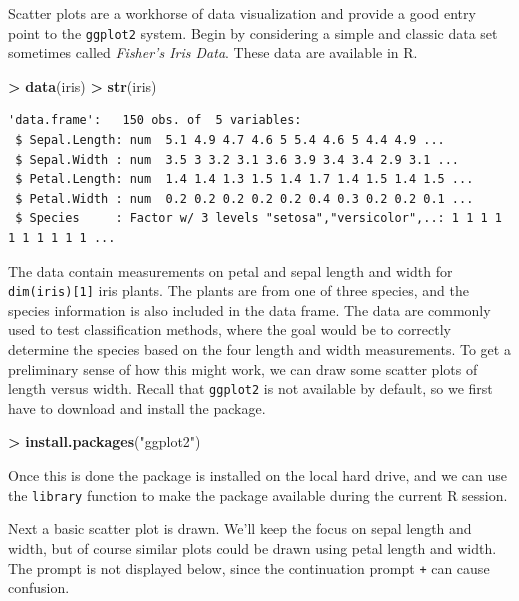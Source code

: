 \documentclass[]{krantz}
\makeatletter
\newenvironment{Shaded}{\begin{snugshade}}{\end{snugshade}}
\newcommand{\KeywordTok}[1]{\textcolor[rgb]{0.27,0.27,0.27}{\textbf{#1}}}
\newcommand{\StringTok}[1]{\textcolor[rgb]{0.5,0.5,0.5}{#1}}
\newcommand{\OperatorTok}[1]{\textcolor[rgb]{0.43,0.43,0.43}{\textbf{#1}}}
\newcommand{\NormalTok}[1]{#1}
\newenvironment{kframe}{%
\medskip{}
\setlength{\fboxsep}{.8em}
 \def\at@end@of@kframe{}%
 \ifinner\ifhmode%
  \def\at@end@of@kframe{\end{minipage}}%
  \begin{minipage}{\columnwidth}%
 \fi\fi%
 \def\FrameCommand##1{\hskip\@totalleftmargin \hskip-\fboxsep
 \colorbox{shadecolor}{##1}\hskip-\fboxsep
     \hskip-\linewidth \hskip-\@totalleftmargin \hskip\columnwidth}%
 \MakeFramed {\advance\hsize-\width
   \@totalleftmargin\z@ \linewidth\hsize
   \@setminipage}}%
 {\par\unskip\endMakeFramed%
 \at@end@of@kframe}
\renewenvironment{Shaded}{\begin{kframe}}{\end{kframe}}
\makeatother
\begin{document}
Scatter plots are a workhorse of data visualization and provide a good
entry point to the \texttt{ggplot2} system. Begin by considering a
simple and classic data set sometimes called \emph{Fisher's Iris Data}.
These data are available in R.

\begin{Shaded}
\begin{Highlighting}[]
\OperatorTok{>}\StringTok{ }\KeywordTok{data}\NormalTok{(iris)}
\OperatorTok{>}\StringTok{ }\KeywordTok{str}\NormalTok{(iris)}
\end{Highlighting}
\end{Shaded}

\begin{verbatim}
'data.frame':   150 obs. of  5 variables:
 $ Sepal.Length: num  5.1 4.9 4.7 4.6 5 5.4 4.6 5 4.4 4.9 ...
 $ Sepal.Width : num  3.5 3 3.2 3.1 3.6 3.9 3.4 3.4 2.9 3.1 ...
 $ Petal.Length: num  1.4 1.4 1.3 1.5 1.4 1.7 1.4 1.5 1.4 1.5 ...
 $ Petal.Width : num  0.2 0.2 0.2 0.2 0.2 0.4 0.3 0.2 0.2 0.1 ...
 $ Species     : Factor w/ 3 levels "setosa","versicolor",..: 1 1 1 1 1 1 1 1 1 1 ...
\end{verbatim}

The data contain measurements on petal and sepal length and width for
\texttt{dim(iris){[}1{]}} iris plants. The plants are from one of three
species, and the species information is also included in the data frame.
The data are commonly used to test classification methods, where the
goal would be to correctly determine the species based on the four
length and width measurements. To get a preliminary sense of how this
might work, we can draw some scatter plots of length versus width.
Recall that \texttt{ggplot2} is not available by default, so we first
have to download and install the package.

\begin{Shaded}
\begin{Highlighting}[]
\OperatorTok{>}\StringTok{ }\KeywordTok{install.packages}\NormalTok{(}\StringTok{"ggplot2"}\NormalTok{)}
\end{Highlighting}
\end{Shaded}

Once this is done the package is installed on the local hard drive, and
we can use the \texttt{library} function to make the package available
during the current R session.

Next a basic scatter plot is drawn. We'll keep the focus on sepal length
and width, but of course similar plots could be drawn using petal length
and width. The prompt is not displayed below, since the continuation
prompt \texttt{+} can cause confusion.
\end{document}
